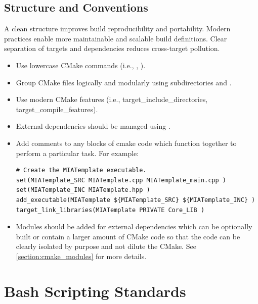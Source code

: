 \subsection{Structure and Conventions}
A clean  structure improves build reproducibility and portability. Modern practices enable more maintainable and scalable build definitions. Clear separation of targets and dependencies reduces cross-target pollution.
\begin{itemize}\itemsep0em
    \item Use lowercase CMake commands (i.e., , ).
    \item Group CMake files logically and modularly using subdirectories and .
    \item Use modern CMake features (i.e., target\_include\_directories, target\_compile\_features).
    \item External dependencies should be managed using .
    \item Add comments to any blocks of cmake code which function together to perform a particular task. For example:
    \begin{lstlisting}[style=pythonstyle]
# Create the MIATemplate executable.
set(MIATemplate_SRC MIATemplate.cpp MIATemplate_main.cpp )
set(MIATemplate_INC MIATemplate.hpp )
add_executable(MIATemplate ${MIATemplate_SRC} ${MIATemplate_INC} )
target_link_libraries(MIATemplate PRIVATE Core_LIB )
    \end{lstlisting}
	\item Modules should be added for external dependencies which can be optionally built or contain a larger amount of CMake code so that the code can be clearly isolated by purpose and not dilute the CMake. See \ref{section:cmake_modules} for more details.
\end{itemize}











\section{Bash Scripting Standards}

